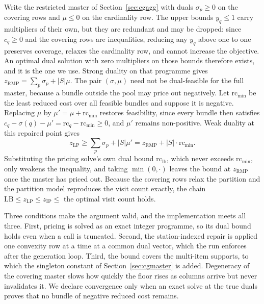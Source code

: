 \documentclass[]{interact}
\begin{document}
Write the restricted master of Section~\ref{sec:cgagg} with duals $\sigma_p\ge 0$ on the covering rows and $\mu\le 0$ on the cardinality row. The upper bounds $y_q\le 1$ carry multipliers of their own, but they are redundant and may be dropped: since $c_q\ge 0$ and the covering rows are inequalities, reducing any $y_q$ above one to one preserves coverage, relaxes the cardinality row, and cannot increase the objective. An optimal dual solution with zero multipliers on those bounds therefore exists, and it is the one we use. Strong duality on that programme gives $z_{\mathrm{RMP}}=\sum_p\sigma_p+|S|\mu$. The pair $(\sigma,\mu)$ need not be dual-feasible for the full master, because a bundle outside the pool may price out negatively. Let $\mathrm{rc}_{\min}$ be the least reduced cost over all feasible bundles and suppose it is negative. Replacing $\mu$ by $\mu'=\mu+\mathrm{rc}_{\min}$ restores feasibility, since every bundle then satisfies $c_q-\sigma(q)-\mu'=\mathrm{rc}_q-\mathrm{rc}_{\min}\ge 0$, and $\mu'$ remains non-positive. Weak duality at this repaired point gives
\begin{equation*}
z_{\mathrm{LP}}\ge\sum_p\sigma_p+|S|\mu'=z_{\mathrm{RMP}}+|S|\cdot\mathrm{rc}_{\min}.
\end{equation*}
Substituting the pricing solve's own dual bound $\mathrm{rc}_{\mathrm{lb}}$, which never exceeds $\mathrm{rc}_{\min}$, only weakens the inequality, and taking $\min(0,\cdot)$ leaves the bound at $z_{\mathrm{RMP}}$ once the master has priced out. Because the covering rows relax the partition and the partition model reproduces the visit count exactly, the chain $\mathrm{LB}\le z_{\mathrm{LP}}\le z_{\mathrm{IP}}\le$ the optimal visit count holds.

Three conditions make the argument valid, and the implementation meets all three. First, pricing is solved as an exact integer programme, so its dual bound holds even when a call is truncated. Second, the station-indexed repair is applied one convexity row at a time at a common dual vector, which the run enforces after the generation loop. Third, the bound covers the multi-item supports, to which the singleton constant of Section~\ref{sec:cgmaster} is added. Degeneracy of the covering master slows how quickly the floor rises as columns arrive but never invalidates it. We declare convergence only when an exact solve at the true duals proves that no bundle of negative reduced cost remains.
\end{document}

